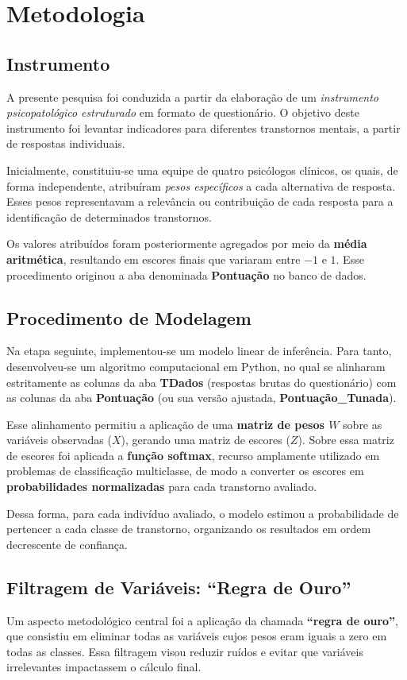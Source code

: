\section{Metodologia}

\subsection{Instrumento}
A presente pesquisa foi conduzida a partir da elaboração de um \textit{instrumento psicopatológico estruturado} em formato de questionário. O objetivo deste instrumento foi levantar indicadores para diferentes transtornos mentais, a partir de respostas individuais.  

Inicialmente, constituiu-se uma equipe de quatro psicólogos clínicos, os quais, de forma independente, atribuíram \textit{pesos específicos} a cada alternativa de resposta. Esses pesos representavam a relevância ou contribuição de cada resposta para a identificação de determinados transtornos.  

Os valores atribuídos foram posteriormente agregados por meio da \textbf{média aritmética}, resultando em escores finais que variaram entre \(-1\) e \(1\). Esse procedimento originou a aba denominada \textbf{Pontuação} no banco de dados.

\subsection{Procedimento de Modelagem}
Na etapa seguinte, implementou-se um modelo linear de inferência. Para tanto, desenvolveu-se um algoritmo computacional em Python, no qual se alinharam estritamente as colunas da aba \textbf{TDados} (respostas brutas do questionário) com as colunas da aba \textbf{Pontuação} (ou sua versão ajustada, \textbf{Pontuação\_Tunada}).  

Esse alinhamento permitiu a aplicação de uma \textbf{matriz de pesos \(W\)} sobre as variáveis observadas (\(X\)), gerando uma matriz de escores (\(Z\)). Sobre essa matriz de escores foi aplicada a \textbf{função softmax}, recurso amplamente utilizado em problemas de classificação multiclasse, de modo a converter os escores em \textbf{probabilidades normalizadas} para cada transtorno avaliado.  

Dessa forma, para cada indivíduo avaliado, o modelo estimou a probabilidade de pertencer a cada classe de transtorno, organizando os resultados em ordem decrescente de confiança.

\subsection{Filtragem de Variáveis: ``Regra de Ouro''}
Um aspecto metodológico central foi a aplicação da chamada \textbf{``regra de ouro''}, que consistiu em eliminar todas as variáveis cujos pesos eram iguais a zero em todas as classes. Essa filtragem visou reduzir ruídos e evitar que variáveis irrelevantes impactassem o cálculo final.

